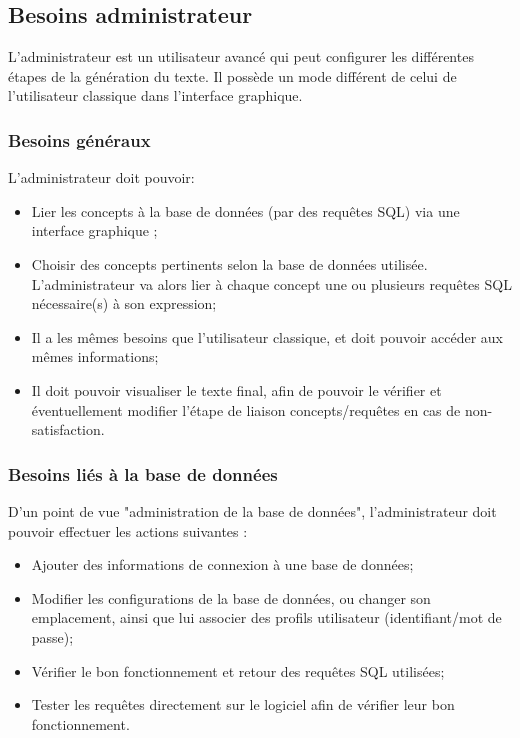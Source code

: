 \documentclass[12pt]{report}
\begin{document}
\subsection{Besoins administrateur}

L'administrateur est un utilisateur avancé qui peut configurer les différentes étapes de la génération du texte. Il possède un mode différent de celui de l'utilisateur classique dans l'interface graphique.

\subsubsection{Besoins généraux}

L'administrateur doit pouvoir:

\begin{itemize}

\item Lier les concepts à la base de données (par des requêtes SQL) via une interface graphique ;
\item Choisir des concepts pertinents selon la base de données utilisée. L'administrateur va alors lier à chaque concept une ou plusieurs requêtes SQL nécessaire(s) à son expression;
\item Il a les mêmes besoins que l'utilisateur classique, et doit pouvoir accéder aux mêmes informations;
\item Il doit pouvoir visualiser le texte final, afin de pouvoir le vérifier et éventuellement modifier l'étape de liaison concepts/requêtes en cas de non-satisfaction.
\end{itemize} 

\subsubsection{Besoins liés à la base de données}

D'un point de vue "administration de la base de données", l'administrateur doit pouvoir effectuer les actions suivantes :

\begin{itemize}

\item Ajouter des informations de connexion à une base de données;
\item Modifier les configurations de la base de données, ou changer son emplacement, ainsi que lui associer des profils utilisateur (identifiant/mot de passe);
\item Vérifier le bon fonctionnement et retour des requêtes SQL utilisées;
\item Tester les requêtes directement sur le logiciel afin de vérifier leur bon fonctionnement.
\end{itemize} 
\end{document}
